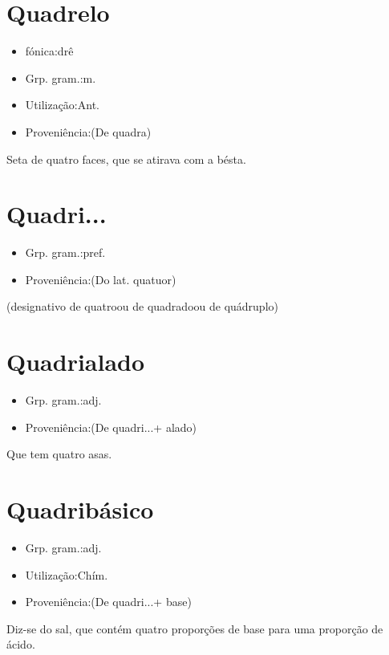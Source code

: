 \section{Quadrelo}
\begin{itemize}
\item {fónica:drê}
\end{itemize}
\begin{itemize}
\item {Grp. gram.:m.}
\end{itemize}
\begin{itemize}
\item {Utilização:Ant.}
\end{itemize}
\begin{itemize}
\item {Proveniência:(De \textunderscore quadra\textunderscore )}
\end{itemize}
Seta de quatro faces, que se atirava com a bésta.
\section{Quadri...}
\begin{itemize}
\item {Grp. gram.:pref.}
\end{itemize}
\begin{itemize}
\item {Proveniência:(Do lat. \textunderscore quatuor\textunderscore )}
\end{itemize}
(designativo de \textunderscore quatro\textunderscore  ou de \textunderscore quadrado\textunderscore  ou de \textunderscore quádruplo\textunderscore )
\section{Quadrialado}
\begin{itemize}
\item {Grp. gram.:adj.}
\end{itemize}
\begin{itemize}
\item {Proveniência:(De \textunderscore quadri...\textunderscore  + \textunderscore alado\textunderscore )}
\end{itemize}
Que tem quatro asas.
\section{Quadribásico}
\begin{itemize}
\item {Grp. gram.:adj.}
\end{itemize}
\begin{itemize}
\item {Utilização:Chím.}
\end{itemize}
\begin{itemize}
\item {Proveniência:(De \textunderscore quadri...\textunderscore  + \textunderscore base\textunderscore )}
\end{itemize}
Diz-se do sal, que contém quatro proporções de base para uma proporção de ácido.
